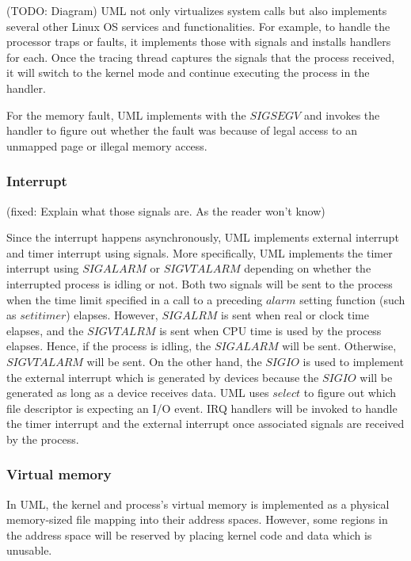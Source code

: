 (TODO: Diagram)
UML not only virtualizes system calls but also implements several other Linux OS services and functionalities. For example, to handle the processor traps or faults, it implements those with signals and installs handlers for each. Once the tracing thread captures the signals that the process received, it will switch to the kernel mode and continue executing the process in the handler.

For the memory fault, UML implements with the $SIGSEGV$ and invokes the handler to figure out whether the fault was because of legal access to an unmapped page or illegal memory access. 

\subsubsection{Interrupt}

(fixed: Explain what those signals are. As the reader won't know)

Since the interrupt happens asynchronously, UML implements external interrupt and timer interrupt using signals. More specifically, UML implements the timer interrupt using $SIGALARM$ or $SIGVTALARM$ depending on whether the interrupted process is idling or not. Both two signals will be sent to the process when the time limit specified in a call to a preceding $alarm$ setting function (such as $setitimer$) elapses. However, $SIGALRM$ is sent when real or clock time elapses, and the $SIGVTALRM$ is sent when CPU time is used by the process elapses. Hence, if the process is idling, the $SIGALARM$ will be sent. Otherwise, $SIGVTALARM$ will be sent. On the other hand, the $SIGIO$ is used to implement the external interrupt which is generated by devices because the $SIGIO$ will be generated as long as a device receives data. UML uses $select$ to figure out which file descriptor is expecting an I/O event. IRQ handlers will be invoked to handle the timer interrupt and the external interrupt once associated signals are received by the process.

\subsubsection{Virtual memory}

In UML, the kernel and process's virtual memory is implemented as a physical memory-sized file mapping into their address spaces. However, some regions in the address space will be reserved by placing kernel code and data which is unusable.

